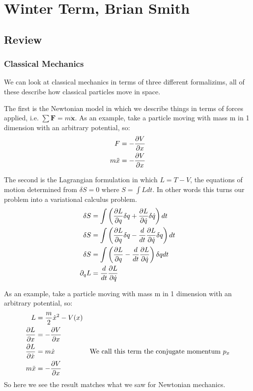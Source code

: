 \chapter{Winter Term, Brian Smith}
\section{Review}
\subsection{Classical Mechanics}
We can look at classical mechanics in terms of three different formalizims, all of these describe how classical particles move in space.

The first is the Newtonian model in which we describe things in terms of forces applied, i.e. $\sum\bm{F}  = m\ddot{\bm{x}}$.
As an example, take a particle moving with mass m in 1 dimension with an arbitrary potential, so:
\begin{align*}
	F &= -\frac{\partial V}{\partial x} \\
	m\ddot{x} &= -\frac{\partial V}{\partial x}
\end{align*}

The second is the Lagrangian formulation in which $L = T -V$, the equations of motion determined from $\delta S = 0$ where $S = \int L dt$. In other words this turns our problem into a variational calculus  problem.
\begin{align*}
	\delta S  &= \int \left(\frac{\partial L}{\partial q} \delta q + \frac{\partial L}{\partial \dot{q}} \delta \dot{q}\right) dt \\
	\delta S  &= \int \left(\frac{\partial L}{\partial q} \delta q - \frac{d}{dt}\frac{\partial L}{\partial \dot{q}} \delta q\right) dt \\
	\delta S  &= \int \left(\frac{\partial L}{\partial q}  - \frac{d}{dt}\frac{\partial L}{\partial \dot{q}}\right)\delta q dt \\
	\partial_q L &= \frac{d}{dt}\frac{\partial L}{\partial \dot{q}}
\end{align*}

As an example, take a particle moving with mass m in 1 dimension with an arbitrary potential, so:
\begin{align*}
	L &= \frac{m}{2}\dot{x}^2 - V(x) \\
	\frac{\partial L}{\partial x} &= -\frac{\partial V}{\partial x} \\
	\frac{\partial L}{\partial {\dot{x}}} &= m \dot{x} & \text{We call this term the conjugate momentum } p_x\\
	m \ddot{x} &= -\frac{\partial V}{\partial x}
\end{align*}
So here we see the result matches what we saw for Newtonian mechanics.


